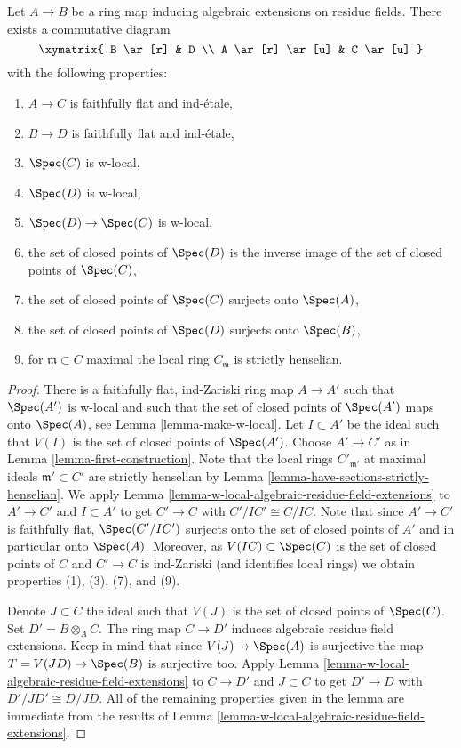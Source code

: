 \begin{lemma}
\label{lemma-get-w-local-algebraic-residue-field-extensions}
Let $A \to B$ be a ring map inducing algebraic extensions on residue fields.
There exists a commutative diagram
$$
\xymatrix{
B \ar[r] & D \\
A \ar[r] \ar[u] & C \ar[u]
}
$$
with the following properties:
\begin{enumerate}
\item $A \to C$ is faithfully flat and ind-\'etale,
\item $B \to D$ is faithfully flat and ind-\'etale,
\item $\Spec(C)$ is w-local,
\item $\Spec(D)$ is w-local,
\item $\Spec(D) \to \Spec(C)$ is w-local,
\item the set of closed points of $\Spec(D)$ is the inverse image
of the set of closed points of $\Spec(C)$,
\item the set of closed points of $\Spec(C)$ surjects onto $\Spec(A)$,
\item the set of closed points of $\Spec(D)$ surjects onto $\Spec(B)$,
\item for $\mathfrak m \subset C$ maximal the local ring
$C_\mathfrak m$ is strictly henselian.
\end{enumerate}
\end{lemma}

\begin{proof}
There is a faithfully flat, ind-Zariski ring map $A \to A'$ such that
$\Spec(A')$ is w-local and such that the set of closed points of
$\Spec(A')$ maps onto $\Spec(A)$, see Lemma \ref{lemma-make-w-local}.
Let $I \subset A'$ be the ideal such that $V(I)$ is the set
of closed points of $\Spec(A')$.
Choose $A' \to C'$ as in Lemma \ref{lemma-first-construction}.
Note that the local rings $C'_{\mathfrak m'}$ at maximal ideals
$\mathfrak m' \subset C'$ are strictly henselian by
Lemma \ref{lemma-have-sections-strictly-henselian}.
We apply Lemma \ref{lemma-w-local-algebraic-residue-field-extensions}
to $A' \to C'$ and $I \subset A'$ to get $C' \to C$ with $C'/IC' \cong C/IC$.
Note that since $A' \to C'$ is faithfully flat, $\Spec(C'/IC')$
surjects onto the set of closed points of $A'$ and in particular
onto $\Spec(A)$. Moreover, as $V(IC) \subset \Spec(C)$
is the set of closed points of $C$ and $C' \to C$ is ind-Zariski
(and identifies local rings) we obtain properties (1), (3), (7), and (9).

\medskip\noindent
Denote $J \subset C$ the ideal such that $V(J)$ is the set of closed
points of $\Spec(C)$. Set $D' = B \otimes_A C$. The ring
map $C \to D'$ induces algebraic residue field extensions. Keep in mind that
since $V(J) \to \Spec(A)$ is surjective the map $T = V(JD) \to \Spec(B)$
is surjective too. Apply
Lemma \ref{lemma-w-local-algebraic-residue-field-extensions}
to $C \to D'$ and $J \subset C$ to get 
$D' \to D$ with $D'/JD' \cong D/JD$.
All of the remaining properties given in the lemma are
immediate from the results of
Lemma \ref{lemma-w-local-algebraic-residue-field-extensions}.
\end{proof}








